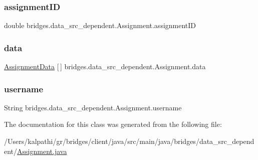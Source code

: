 \subsubsection{\texorpdfstring{assignment\+ID}{assignmentID}}
{\footnotesize\ttfamily double bridges.\+data\+\_\+src\+\_\+dependent.\+Assignment.\+assignment\+ID}

\mbox{\label{classbridges_1_1data__src__dependent_1_1_assignment_a23d503c5e6eae939bb8262dc8e18c259}} 
\subsubsection{\texorpdfstring{data}{data}}
{\footnotesize\ttfamily \mbox{\hyperlink{classbridges_1_1data__src__dependent_1_1_assignment_data}{Assignment\+Data}} \mbox{[}$\,$\mbox{]} bridges.\+data\+\_\+src\+\_\+dependent.\+Assignment.\+data}

\mbox{\label{classbridges_1_1data__src__dependent_1_1_assignment_aa7326ba8e0eb02fff4e5b22e4b89e61d}} 
\subsubsection{\texorpdfstring{username}{username}}
{\footnotesize\ttfamily String bridges.\+data\+\_\+src\+\_\+dependent.\+Assignment.\+username}



The documentation for this class was generated from the following file\+:\begin{DoxyCompactItemize}
\item 
/\+Users/kalpathi/gr/bridges/client/java/src/main/java/bridges/data\+\_\+src\+\_\+dependent/\mbox{\hyperlink{_assignment_8java}{Assignment.\+java}}\end{DoxyCompactItemize}
